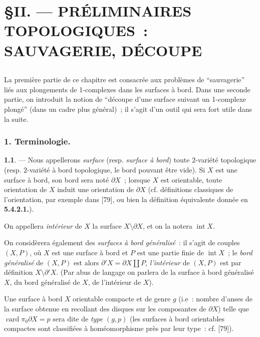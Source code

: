 

\chapter*{\S \space II. --- PRÉLIMINAIRES TOPOLOGIQUES~: SAUVAGERIE, DÉCOUPE}
\section*{}

La première partie de ce chapitre est consacrée aux problèmes de ``sauvagerie'' liés aux plongements de 1-complexes dans les surfaces à bord. Dans une seconde partie, on introduit la notion de ``découpe d'une surface suivant un 1-complexe plongé'' (dans un cadre plus général)~; il s'agit d'un outil qui sera fort utile dans la suite.

\subsection*{1. Terminologie.}

{\bf 1.1}. --- Nous appellerons \emph{surface} (resp. \emph{surface à bord}) toute $2$-variété topologique (resp. $2$-variété à bord topologique, le bord pouvant être vide). Si $X$ est une surface à bord, son bord sera noté $\partial X$~; lorsque $X$ est orientable, toute orientation de $X$ induit une orientation de $\partial X$ (cf. définitions classiques de l'orientation, par exemple dans [79], ou bien la définition équivalente donnée en {\bf 5.4.2.1.}). 

On appellera \emph{intérieur} de $X$ la surface $X \setminus \partial X$, et on la notera $\operatorname{int} X$.

On considèrera également des \emph{surfaces à bord généralisé}~: il s'agit de couples $(X, P)$, où $X$ est une surface à bord et $P$ est une partie finie de $\operatorname{int} X$~; le \emph{bord généralisé} de $(X, P)$ est alors $\partial'X = \partial X \amalg P$, \emph{l'intérieur} de $(X,P)$ est par définition $X \setminus \partial'X$. (Par abus de langage on parlera de la surface à bord généralisé $X$, du bord généralisé de $X$, de l'intérieur de $X$).

Une surface à bord $X$ orientable compacte et de genre $g$ (i.e~: nombre d'anses de la surface obtenue en recollant des disques sur les composantes de $\partial X$) telle que $\operatorname{card} \pi_0 \partial X = p$ sera dite de \emph{type} $(g,p)$ (les surfaces à bord orientables compactes sont classifiées à homéomorphisme près par leur type~: cf. [79]).

